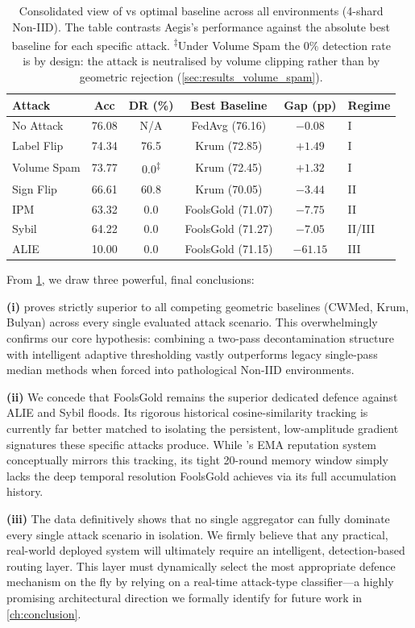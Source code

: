 \documentclass[../main.tex]{subfiles}
\begin{document}
\begin{table}[htbp]
\centering
\caption[Consolidated view of \aegis{} vs optimal baseline]{Consolidated view of \aegis{} vs optimal baseline across all environments (4-shard Non-IID). The table contrasts Aegis's performance against the absolute best baseline for each specific attack. \textsuperscript{$\ddagger$}Under Volume Spam the $0\%$ detection rate is by design: the attack is neutralised by volume clipping rather than by geometric rejection (\cref{sec:results_volume_spam}).}
\label{tab:results_summary}
\begin{tabularx}{\linewidth}{lccccX}
\toprule
\textbf{Attack} & \textbf{\aegis{} Acc} & \textbf{DR (\%)} & \textbf{Best Baseline} & \textbf{Gap (pp)} & \textbf{Regime} \\
\midrule
No Attack   & 76.08 & N/A &  FedAvg (76.16)   & $-0.08$ & I \\
Label Flip  & 74.34 & 76.5 & Krum (72.85)     & $+1.49$ & I \\
Volume Spam & 73.77 & 0.0\textsuperscript{$\ddagger$} & Krum (72.45) & $+1.32$ & I \\
Sign Flip   & 66.61 & 60.8 & Krum (70.05)     & $-3.44$ & II \\
IPM         & 63.32 &  0.0 & FoolsGold (71.07) & $-7.75$ & II \\
Sybil       & 64.22 &  0.0 & FoolsGold (71.27) & $-7.05$ & II/III \\
ALIE        & 10.00 &  0.0 & FoolsGold (71.15) & $-61.15$ & III \\
\bottomrule
\end{tabularx}
\end{table}

From \cref{tab:results_summary}, we draw three powerful, final conclusions:

\textbf{(i)} \aegis{} proves strictly superior to all competing geometric baselines (CWMed, Krum, Bulyan) across every single evaluated attack scenario. This overwhelmingly confirms our core hypothesis: combining a two-pass decontamination structure with intelligent adaptive thresholding vastly outperforms legacy single-pass median methods when forced into pathological Non-IID environments.

\textbf{(ii)} We concede that FoolsGold remains the superior dedicated defence against ALIE and Sybil floods. Its rigorous historical cosine-similarity tracking is currently far better matched to isolating the persistent, low-amplitude gradient signatures these specific attacks produce. While \aegis{}'s EMA reputation system conceptually mirrors this tracking, its tight 20-round memory window simply lacks the deep temporal resolution FoolsGold achieves via its full accumulation history.

\textbf{(iii)} The data definitively shows that no single aggregator can fully dominate every single attack scenario in isolation. We firmly believe that any practical, real-world deployed system will ultimately require an intelligent, detection-based routing layer. This layer must dynamically select the most appropriate defence mechanism on the fly by relying on a real-time attack-type classifier---a highly promising architectural direction we formally identify for future work in \cref{ch:conclusion}.
\end{document}
